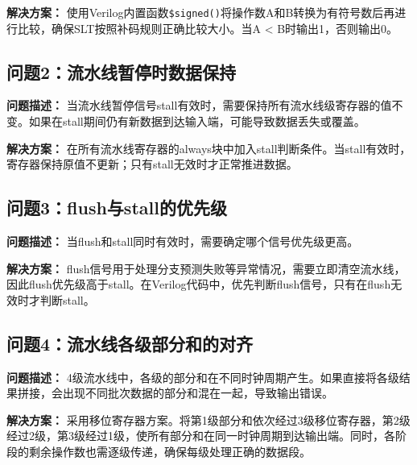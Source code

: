 \textbf{解决方案：}
使用Verilog内置函数\texttt{\$signed()}将操作数A和B转换为有符号数后再进行比较，确保SLT按照补码规则正确比较大小。当A < B时输出1，否则输出0。

\subsection{问题2：流水线暂停时数据保持}
\textbf{问题描述：}
当流水线暂停信号stall有效时，需要保持所有流水线级寄存器的值不变。如果在stall期间仍有新数据到达输入端，可能导致数据丢失或覆盖。

\textbf{解决方案：}
在所有流水线寄存器的always块中加入stall判断条件。当stall有效时，寄存器保持原值不更新；只有stall无效时才正常推进数据。

\subsection{问题3：flush与stall的优先级}
\textbf{问题描述：}
当flush和stall同时有效时，需要确定哪个信号优先级更高。

\textbf{解决方案：}
flush信号用于处理分支预测失败等异常情况，需要立即清空流水线，因此flush优先级高于stall。在Verilog代码中，优先判断flush信号，只有在flush无效时才判断stall。

\subsection{问题4：流水线各级部分和的对齐}
\textbf{问题描述：}
4级流水线中，各级的部分和在不同时钟周期产生。如果直接将各级结果拼接，会出现不同批次数据的部分和混在一起，导致输出错误。

\textbf{解决方案：}
采用移位寄存器方案。将第1级部分和依次经过3级移位寄存器，第2级经过2级，第3级经过1级，使所有部分和在同一时钟周期到达输出端。同时，各阶段的剩余操作数也需逐级传递，确保每级处理正确的数据段。
